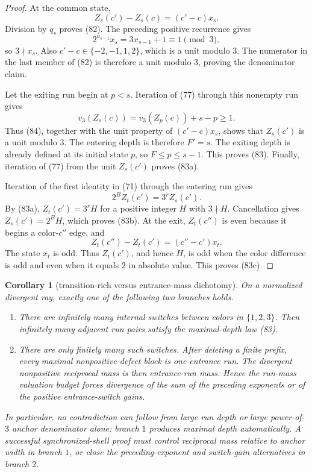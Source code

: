\documentclass[11pt]{article}
\newtheorem{corollary}[theorem]{Corollary}
\begin{document}
\begin{proof}
At the common state,
\[
  Z_s(c')-Z_s(c)=(c'-c)x_s.
  \tag{84}
\]
Division by $q_s$ proves (82).  The preceding positive recurrence gives
\[
  2^{a_{s-1}}x_s=3x_{s-1}+1\equiv1\pmod3,
  \tag{85}
\]
so $3\nmid x_s$.  Also
$c'-c\in\{-2,-1,1,2\}$, which is a unit modulo $3$.  The numerator in the
last member of (82) is therefore a unit modulo $3$, proving the denominator
claim.

Let the exiting run begin at $p<s$.  Iteration of (77) through this nonempty
run gives
\[
  v_3(Z_s(c))=v_3(Z_p(c))+s-p\geq1.
\]
Thus (84), together with the unit property of $(c'-c)x_s$, shows that
$Z_s(c')$ is a unit modulo $3$.  The entering depth is therefore $F'=s$.
The exiting depth is already defined at its initial state $p$, so
$F\leq p\leq s-1$.  This proves (83).  Finally, iteration of (77) from the
unit $Z_s(c')$ proves (83a).

Iteration of the first identity in (71) through the entering run gives
\[
  2^BZ_t(c')=3^rZ_s(c').
\]
By (83a), $Z_t(c')=3^rH$ for a positive integer $H$ with $3\nmid H$.
Cancellation gives $Z_s(c')=2^BH$, which proves (83b).  At the exit,
$Z_t(c'')$ is even because it begins a color-$c''$ edge, and
\[
  Z_t(c'')-Z_t(c')=(c''-c')x_t.
\]
The state $x_t$ is odd.  Thus $Z_t(c')$, and hence $H$, is odd when the
color difference is odd and even when it equals $2$ in absolute value.
This proves (83c).
\end{proof}

\begin{corollary}[transition-rich versus entrance-mass dichotomy]
On a normalized divergent ray, exactly one of the following two branches
holds.

\begin{enumerate}
  \item There are infinitely many internal switches between colors in
  $\{1,2,3\}$.  Then infinitely many adjacent run pairs satisfy the
  maximal-depth law (83).

  \item There are only finitely many such switches.  After deleting a
  finite prefix, every maximal nonpositive-defect block is one entrance
  run.  The divergent nonpositive reciprocal mass is then entrance-run
  mass.  Hence the run-mass valuation budget forces divergence of the sum
  of the preceding exponents or of the positive entrance-switch gains.
\end{enumerate}

In particular, no contradiction can follow from large run depth or large
power-of-$3$ anchor denominator alone: branch $1$ produces maximal depth
automatically.  A successful synchronized-shell proof must control
reciprocal mass relative to anchor width in branch $1$, or close the
preceding-exponent and switch-gain alternatives in branch $2$.
\end{corollary}
\end{document}
